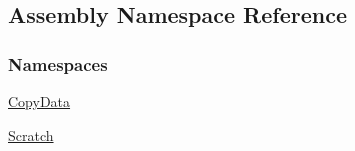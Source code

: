 \hypertarget{namespace_assembly}{}\subsection{Assembly Namespace Reference}
\label{namespace_assembly}
\subsubsection*{Namespaces}
\begin{DoxyCompactItemize}
\item 
 \hyperlink{namespace_assembly_1_1_copy_data}{Copy\+Data}
\item 
 \hyperlink{namespace_assembly_1_1_scratch}{Scratch}
\end{DoxyCompactItemize}
